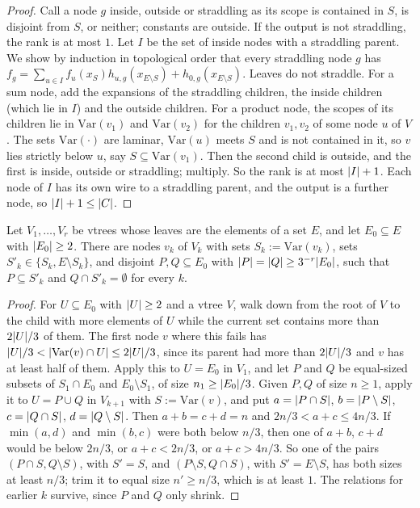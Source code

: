 \begin{proof}
Call a node $g$ inside, outside or straddling as its scope is contained in $S$, is disjoint from $S$, or neither; constants are outside. If the output is not straddling, the rank is at most $1$. Let $I$ be the set of inside nodes with a straddling parent. We show by induction in topological order that every straddling node $g$ has $f_g=\sum_{u\in I}f_u(x_S)h_{u,g}(x_{E\setminus S})+h_{0,g}(x_{E\setminus S})$. Leaves do not straddle. For a sum node, add the expansions of the straddling children, the inside children (which lie in $I$) and the outside children. For a product node, the scopes of its children lie in $\mathrm{Var}(v_1)$ and $\mathrm{Var}(v_2)$ for the children $v_1,v_2$ of some node $u$ of $V$. The sets $\mathrm{Var}(\cdot)$ are laminar, $\mathrm{Var}(u)$ meets $S$ and is not contained in it, so $v$ lies strictly below $u$, say $S\subseteq\mathrm{Var}(v_1)$. Then the second child is outside, and the first is inside, outside or straddling; multiply. So the rank is at most $\lvert I\rvert+1$. Each node of $I$ has its own wire to a straddling parent, and the output is a further node, so $\lvert I\rvert+1\le\lvert C\rvert$.
\end{proof}

\begin{lemma}\label{lem:vtree-refine}
Let $V_1,\dots,V_r$ be vtrees whose leaves are the elements of a set $E$, and let $E_0\subseteq E$ with $\lvert E_0\rvert\ge2$. There are nodes $v_k$ of $V_k$ with sets $S_k:=\mathrm{Var}(v_k)$, sets $S'_k\in\{S_k,E\setminus S_k\}$, and disjoint $P,Q\subseteq E_0$ with $\lvert P\rvert=\lvert Q\rvert\ge3^{-r}\lvert E_0\rvert$, such that $P\subseteq S'_k$ and $Q\cap S'_k=\emptyset$ for every $k$.
\end{lemma}

\begin{proof}
For $U\subseteq E_0$ with $\lvert U\rvert\ge2$ and a vtree $V$, walk down from the root of $V$ to the child with more elements of $U$ while the current set contains more than $2\lvert U\rvert/3$ of them. The first node $v$ where this fails has $\lvert U\rvert/3<\lvert \mathrm{Var}(v)\cap U\rvert\le2\lvert U\rvert/3$, since its parent had more than $2\lvert U\rvert/3$ and $v$ has at least half of them. Apply this to $U=E_0$ in $V_1$, and let $P$ and $Q$ be equal-sized subsets of $S_1\cap E_0$ and $E_0\setminus S_1$, of size $n_1\ge\lvert E_0\rvert/3$. Given $P,Q$ of size $n\ge1$, apply it to $U=P\cup Q$ in $V_{k+1}$ with $S:=\mathrm{Var}(v)$, and put $a=\lvert P\cap S\rvert$, $b=\lvert P\setminus S\rvert$, $c=\lvert Q\cap S\rvert$, $d=\lvert Q\setminus S\rvert$. Then $a+b=c+d=n$ and $2n/3<a+c\le4n/3$. If $\min(a,d)$ and $\min(b,c)$ were both below $n/3$, then one of $a+b$, $c+d$ would be below $2n/3$, or $a+c<2n/3$, or $a+c>4n/3$. So one of the pairs $(P\cap S,Q\setminus S)$, with $S'=S$, and $(P\setminus S,Q\cap S)$, with $S'=E\setminus S$, has both sizes at least $n/3$; trim it to equal size $n'\ge n/3$, which is at least $1$. The relations for earlier $k$ survive, since $P$ and $Q$ only shrink.
\end{proof}

